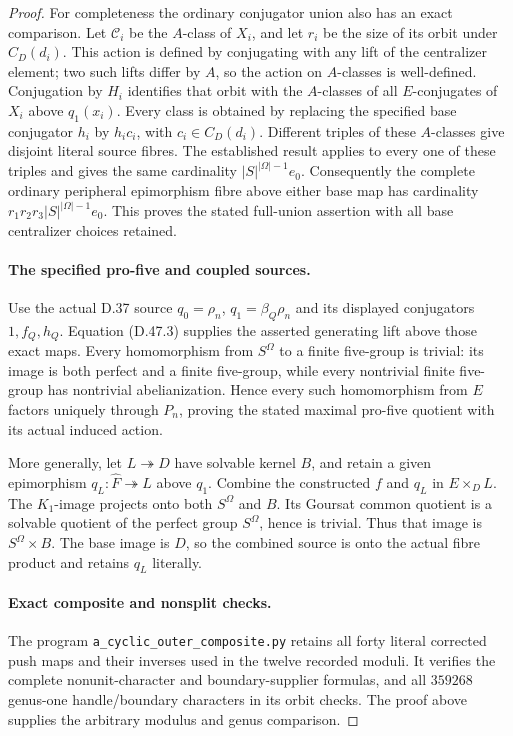 \begin{proof}
For completeness the ordinary conjugator union also has
an exact comparison. Let \(\mathcal C_i\) be the
\(A\)-class of \(X_i\), and let \(r_i\) be the size of
its orbit under \(C_D(d_i)\). This action is defined by
conjugating with any lift of the centralizer element;
two such lifts differ by \(A\), so the action on
\(A\)-classes is well-defined. Conjugation by \(H_i\)
identifies that orbit with the \(A\)-classes of all
\(E\)-conjugates of \(X_i\) above \(q_1(x_i)\).
Every class is obtained by replacing the specified base
conjugator \(h_i\) by \(h_ic_i\), with
\(c_i\in C_D(d_i)\). Different triples of these
\(A\)-classes give disjoint literal source fibres.
The established result applies to every one of these
triples and gives the same cardinality
\(|S|^{|\Omega|-1}e_0\). Consequently the complete
ordinary peripheral epimorphism fibre above either
base map has cardinality
\(r_1r_2r_3|S|^{|\Omega|-1}e_0\).
This proves the stated full-union assertion with all
base centralizer choices retained.

\paragraph{The specified pro-five and coupled sources.}
Use the actual D.37 source \(q_0=\rho_n\),
\(q_1=\beta_Q\rho_n\) and its displayed conjugators
\(1,f_Q,h_Q\). Equation \textup{(D.47.3)} supplies
the asserted generating lift above those exact maps.
Every homomorphism from \(S^\Omega\) to a finite
five-group is trivial: its image is both perfect and
a finite five-group, while every nontrivial finite
five-group has nontrivial abelianization. Hence
every such homomorphism from \(E\) factors uniquely
through \(P_n\), proving the stated maximal pro-five
quotient with its actual induced action.

More generally, let \(L\twoheadrightarrow D\) have
solvable kernel \(B\), and retain a given epimorphism
\(q_L:\widehat F\twoheadrightarrow L\) above \(q_1\).
Combine the constructed \(f\) and \(q_L\) in
\(E\times_D L\). The \(K_1\)-image projects onto
both \(S^\Omega\) and \(B\). Its Goursat common
quotient is a solvable quotient of the perfect group
\(S^\Omega\), hence is trivial. Thus that image is
\(S^\Omega\times B\). The base image is \(D\),
so the combined source is onto the actual fibre
product and retains \(q_L\) literally.

\paragraph{Exact composite and nonsplit checks.}
The program \texttt{a\_cyclic\_outer\_composite.py}
retains all forty literal corrected push maps and
their inverses used in the twelve recorded moduli.
It verifies the complete nonunit-character and
boundary-supplier formulas, and all \(359268\)
genus-one handle/boundary characters in its orbit
checks. The proof above supplies the arbitrary
modulus and genus comparison.


\end{proof}
